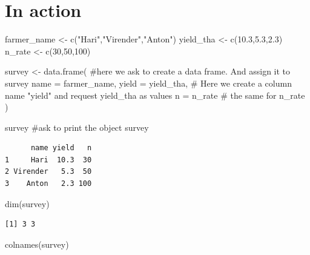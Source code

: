 \documentclass[
  letterpaper,
  DIV=11,
  numbers=noendperiod]{scrreprt}
\newenvironment{Shaded}{\begin{snugshade}}{\end{snugshade}}
\newcommand{\AttributeTok}[1]{\textcolor[rgb]{0.40,0.45,0.13}{#1}}
\newcommand{\CommentTok}[1]{\textcolor[rgb]{0.37,0.37,0.37}{#1}}
\newcommand{\DecValTok}[1]{\textcolor[rgb]{0.68,0.00,0.00}{#1}}
\newcommand{\FloatTok}[1]{\textcolor[rgb]{0.68,0.00,0.00}{#1}}
\newcommand{\FunctionTok}[1]{\textcolor[rgb]{0.28,0.35,0.67}{#1}}
\newcommand{\NormalTok}[1]{\textcolor[rgb]{0.00,0.23,0.31}{#1}}
\newcommand{\OtherTok}[1]{\textcolor[rgb]{0.00,0.23,0.31}{#1}}
\newcommand{\StringTok}[1]{\textcolor[rgb]{0.13,0.47,0.30}{#1}}
\begin{document}
\hypertarget{in-action-1}{%
\section{In action}\label{in-action-1}}

\begin{Shaded}
\begin{Highlighting}[]
\NormalTok{farmer\_name }\OtherTok{\textless{}{-}} \FunctionTok{c}\NormalTok{(}\StringTok{"Hari"}\NormalTok{,}\StringTok{"Virender"}\NormalTok{,}\StringTok{"Anton"}\NormalTok{)}
\NormalTok{yield\_tha }\OtherTok{\textless{}{-}} \FunctionTok{c}\NormalTok{(}\FloatTok{10.3}\NormalTok{,}\FloatTok{5.3}\NormalTok{,}\FloatTok{2.3}\NormalTok{)}
\NormalTok{n\_rate }\OtherTok{\textless{}{-}} \FunctionTok{c}\NormalTok{(}\DecValTok{30}\NormalTok{,}\DecValTok{50}\NormalTok{,}\DecValTok{100}\NormalTok{)}

\NormalTok{survey }\OtherTok{\textless{}{-}} \FunctionTok{data.frame}\NormalTok{( }\CommentTok{\#here we ask to create a data frame. And assign it to survey}
  \AttributeTok{name =}\NormalTok{ farmer\_name,}
  \AttributeTok{yield =}\NormalTok{ yield\_tha, }\CommentTok{\# Here we create a column name "yield" and request yield\_tha as values}
  \AttributeTok{n =}\NormalTok{ n\_rate }\CommentTok{\# the same for n\_rate}
\NormalTok{)}

\NormalTok{survey }\CommentTok{\#ask to print the object survey}
\end{Highlighting}
\end{Shaded}

\begin{verbatim}
      name yield   n
1     Hari  10.3  30
2 Virender   5.3  50
3    Anton   2.3 100
\end{verbatim}

\begin{Shaded}
\begin{Highlighting}[]
\FunctionTok{dim}\NormalTok{(survey)}
\end{Highlighting}
\end{Shaded}

\begin{verbatim}
[1] 3 3
\end{verbatim}

\begin{Shaded}
\begin{Highlighting}[]
\FunctionTok{colnames}\NormalTok{(survey)}
\end{Highlighting}
\end{Shaded}
\end{document}
